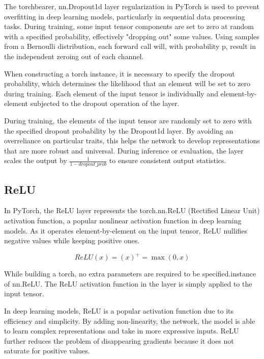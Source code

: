 The torchbearer, nn.Dropout1d layer regularization in PyTorch is used to prevent overfitting in deep learning models, particularly in sequential data processing tasks. During training, some input tensor components are set to zero at random with a specified probability, effectively "dropping out" some values. Using samples from a Bernoulli distribution, each forward call will, with probability p, result in the independent zeroing out of each channel.



When constructing a torch instance, it is necessary to specify the dropout probability, which determines the likelihood that an element will be set to zero during training. Each element of the input tensor is individually and element-by-element subjected to the dropout operation of the layer.




During training, the elements of the input tensor are randomly set to zero with the specified dropout probability by the Dropout1d layer. By avoiding an overreliance on particular traits, this helps the network to develop representations that are more robust and universal. During inference or evaluation, the layer scales the output by $\frac{1}{1-dropout\_prob}$ to ensure consistent output statistics.

\subsection{ReLU}

In PyTorch, the ReLU layer represents the torch.nn.ReLU (Rectified Linear Unit) activation function, a popular nonlinear activation function in deep learning models. As it operates element-by-element on the input tensor, ReLU nullifies negative values while keeping positive ones.


\begin{equation}
    ReLU(x) = {(x)}^{+} = \max(0, x)
\end{equation}

While building a torch, no extra parameters are required to be specified.instance of nn.ReLU. The ReLU activation function in the layer is simply applied to the input tensor.

In deep learning models, ReLU is a popular activation function due to its efficiency and simplicity. By adding non-linearity, the network, the model is able to learn complex representations and take in more expressive inputs. ReLU further reduces the problem of disappearing gradients because it does not saturate for positive values.

